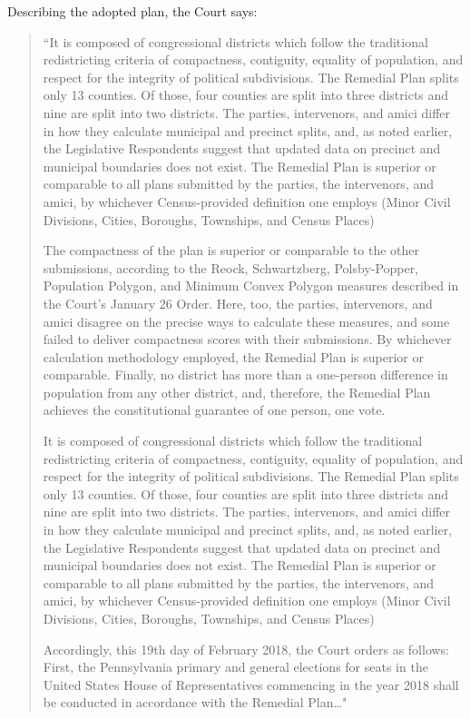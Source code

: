 Describing the adopted plan, the Court says:
        \begin{quote}
            ``It is composed of congressional districts which follow the traditional redistricting criteria of compactness, contiguity, equality of population, and respect for the integrity of political subdivisions. The Remedial Plan splits only 13 counties. Of those, four counties are split into three districts and nine are split into two districts. The parties, intervenors, and amici differ in how they calculate municipal and precinct splits, and, as noted earlier, the Legislative Respondents suggest that updated data on precinct and municipal boundaries does not exist. The Remedial Plan is superior or comparable to all plans submitted by the parties, the intervenors, and amici, by whichever Census-provided definition one employs (Minor Civil Divisions, Cities, Boroughs, Townships, and Census Places)

            The compactness of the plan is superior or comparable to the other submissions, according to the Reock, Schwartzberg, Polsby-Popper, Population Polygon, and Minimum Convex Polygon measures described in the Court’s January 26 Order. Here, too, the parties, intervenors, and amici disagree on the precise ways to calculate these measures, and some failed to deliver compactness scores with their submissions. By whichever calculation methodology employed, the Remedial Plan is superior or comparable. Finally, no district has more than a one-person difference in population from any other district, and, therefore, the Remedial Plan achieves the constitutional guarantee of one person, one vote.

            It is composed of congressional districts which follow the traditional redistricting criteria of compactness, contiguity, equality of population, and respect for the integrity of political subdivisions. The Remedial Plan splits only 13 counties. Of those, four counties are split into three districts and nine are split into two districts. The parties, intervenors, and amici differ in how they calculate municipal and precinct splits, and, as noted earlier, the Legislative Respondents suggest that updated data on precinct and municipal boundaries does not exist. The Remedial Plan is superior or comparable to all plans submitted by the parties, the intervenors, and amici, by whichever Census-provided definition one employs (Minor Civil Divisions, Cities, Boroughs, Townships, and Census Places)

            Accordingly, this 19th day of February 2018, the Court orders as follows: First, the Pennsylvania primary and general elections for seats in the United States House of Representatives commencing in the year 2018 shall be conducted in accordance with the Remedial Plan\dots"
          \end{quote}

